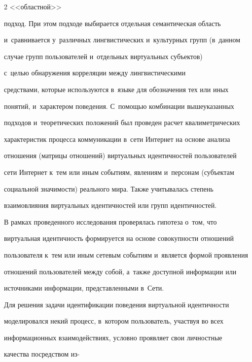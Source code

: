 \begin{multicols}{2}
<<областной>> 

подход. При этом подходе выбирается отдельная семантическая область 

и~сравнивается у~различных лингвистических и~культурных групп (в~данном 

случае групп пользователей и~отдельных виртуальных субъектов) 

с~\mbox{целью} обнаружения корреляции между лингвистическими 

средствами, которые используются в~языке для обозначения тех или иных 

понятий, и~характером поведения. С~по\-мощью комбинации вышеуказанных 

подходов и~теоретических положений был проведен расчет квалиметрических 

характеристик процесса коммуникации в~сети Интернет на основе анализа 

отношения (матрицы отношений) виртуальных идентичностей пользователей 

сети Интернет к~тем или иным событиям, явлениям и~персонам (субъектам 

социальной значимости) реального мира. Также учитывалась степень 

взаимовлияния виртуальных идентичностей или групп идентичностей.

  

  В рамках проведенного исследования проверялась гипотеза о~том, что 

виртуальная идентичность формируется на основе совокупности отношений 

пользователя к~тем или иным сетевым событиям и~является формой проявления 

отношений пользователей между собой, а~также доступной информации или 

источниками информации, представленными в~Сети.

  

  Для решения задачи идентификации поведения виртуальной идентичности 

моделировался некий процесс, в~котором пользователь, участвуя во всех 

информационных взаимодействиях, условно проявляет свои личностные 

качества посредством из-\linebreak\vspace*{-12pt}



 { \begin{center}  %


\end{center}}
\end{multicols}
